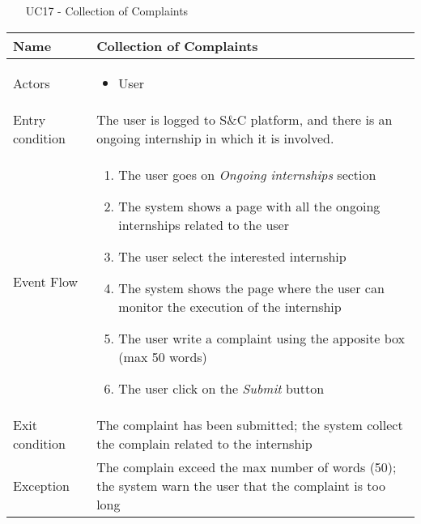 				
				\begin{table} [H]
					\centering
					\begin{itemize}
						\item [UC17] - Collection of Complaints
					\end{itemize}
					
					\begin{tabular}{|| P{7.5cm} | P{7.5cm} ||}
						\hline
						Name & Collection of Complaints \\
						\hline
						Actors & \parbox{5cm}{\begin{itemize}
								\item User
							\end{itemize}
						} \\
						\hline
						Entry condition & The user is logged to S\&C platform, 
						and there is an ongoing internship in 
						which it is involved.  \\
						\hline
						Event Flow & \parbox{5cm}{\begin{enumerate}
								\item The user goes on \textit{ 
								Ongoing internships} section 
								\item The system shows a page with 
								all the ongoing internships 
								related to the user  
								\item The user select the interested 
								internship  
								\item The system shows the page 
								where the user can monitor the 
								execution of the internship
								\item The user write a complaint 
								using the apposite box (max 50 
								words) 
								\item The user click on the \textit{Submit}
								button
						\end{enumerate}} \\
						\hline 
						Exit condition & The complaint has been submitted; 
						the system collect the complain 
						related to the internship \\
						\hline
						Exception & The complain exceed the max number 
						of words (50); the system warn the 
						user that the complaint is too long \\
						\hline
					\end{tabular}
				\end{table}
				
